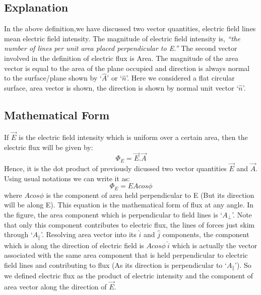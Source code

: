 \subsection*{Explanation}
In the above definition,we have discussed two vector quantities,
electric field lines mean electric field intensity. The magnitude of
electric field intensity is, \textit{“the number of lines per unit area
placed perpendicular to E.”} The second vector involved in the
definition of electric flux is Area. The magnitude of the area vector
is equal to the area of the plane occupied and direction is always normal
to the surface/plane shown by `$\hat{A}$' or `$\hat{n}$'.
Here we considered a flat circular surface, area vector is shown,
the direction is shown by normal unit vector `$\hat{n}$'.
\subsection*{Mathematical Form}
If $\vec{E}$ is the electric field intensity which is uniform over a certain area,
then the electric flux will be given by:
\begin{equation}\label{eq:11.17}
  \Phi_{E}  = \vec{E}.\vec{A}
\end{equation}
Hence, it is the dot product of previously dicussed two vector
quantities $\vec{E}$ and $\vec{A}$.
Using usual notations we can write it as:
\begin{equation}
  \Phi_{E} = EAcos\phi
\end{equation}
where $Acos\phi$ is the component of area held perpendicular to
E (But its direction will be along E).
This equation is the mathematical form of flux at any angle.
In the figure, the area component which is perpendicular
to field lines is  `$A_{\bot}$'. Note that only this component contributes
to electric flux, the lines of forces just skim through `$A_{\parallel}$'.
Resolving area vector into its $\hat{i}$ and $\hat{j}$ components,
the component which is along the direction of electric field is $Acos\phi\:\hat{i}$
which is actually the vector associated with the same area component
that is held perpendicular to electric field lines and contributing
to flux (As its direction is perpendicular to `$A_{\parallel}$').
So we defined electric flux as the product of electric
intensity and the component of area vector along the direction of $\vec{E}$.

